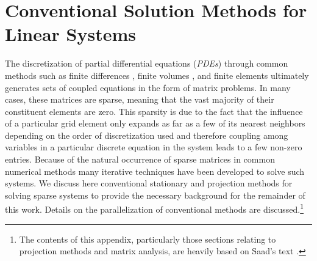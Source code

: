 \chapter{Conventional Solution Methods for Linear Systems\ }
\label{ch:linear_problem}
The discretization of partial differential equations (\textit{PDEs})
through common methods such as finite differences
\cite{leveque_finite_2007}, finite volumes
\cite{leveque_finite_2002}, and finite elements
\cite{zienkiewicz_finite_2005} ultimately generates sets of coupled
equations in the form of matrix problems. In many cases, these
matrices are sparse, meaning that the vast majority of their
constituent elements are zero. This sparsity is due to the fact that
the influence of a particular grid element only expands as far as a
few of its nearest neighbors depending on the order of discretization
used and therefore coupling among variables in a particular discrete
equation in the system leads to a few non-zero entries. Because of the
natural occurrence of sparse matrices in common numerical methods many
iterative techniques have been developed to solve such systems. We
discuss here conventional stationary and projection methods for
solving sparse systems to provide the necessary background for the
remainder of this work. Details on the parallelization of conventional
methods are discussed.\footnote{The contents of this appendix,
  particularly those sections relating to projection methods and
  matrix analysis, are heavily based on Saad's text
  \cite{saad_iterative_2003}.}

